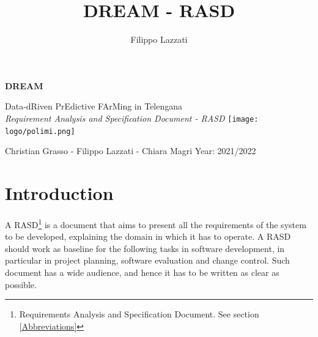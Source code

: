 \documentclass{article}
\title{DREAM - RASD}
\author{Filippo Lazzati}
\begin{document}
\thispagestyle{empty} 
\begin{titlepage}
    \begin{center}
       {\Huge \textbf{DREAM}} %
       \vspace{0.5cm}
       \\
    \begin{LARGE}
        {Data-dRiven PrEdictive FArMing in Telengana}
        \vspace{1.0cm}
        \\
        {\textit{Requirement Analysis and Specification Document - RASD}}
        \texttt{[image: logo/polimi.png]}
       \vspace{1.5cm}
        
        {Christian Grasso - Filippo Lazzati - Chiara Magri}
       \vspace{0.5cm}
       {Year: 2021/2022}
       
    \end{LARGE}  
   \end{center}
\end{titlepage}
\newpage
\tableofcontents %
\newpage
\section{Introduction}
A RASD\footnote{Requirements Analysis and Specification Document. See section \ref{Abbreviations}} is a document that aims to present all the requirements of the system to be developed, explaining the 
domain in which it has to operate. A RASD should work as baseline for the following tasks in software development,
in particular in project planning, software evaluation and change control. Such document has a wide audience, and hence it has to
be written as clear as possible.
\end{document}
